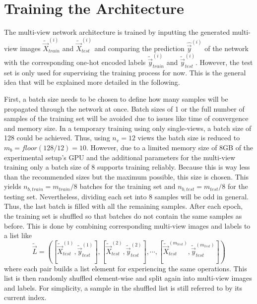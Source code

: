 \section{Training the Architecture}
\label{sec:methods-training}
The multi-view network architecture is trained by inputting the generated multi-view images $\tilde{\vec{X}}_{train}^{(i)}$ and $\tilde{\vec{X}}_{test}^{(i)}$ and comparing the prediction $\hat{\vec{y}}^{(i)}$ of the network with the corresponding one-hot encoded labels $\tilde{\vec{y}}_{train}^{(i)}$ and $\tilde{\vec{y}}_{test}^{(i)}$.
However, the test set is only used for supervising the training process for now.
This is the general idea that will be explained more detailed in the following.

First, a batch size needs to be chosen to define how many samples will be propagated through the network at once.
Batch sizes of 1 or the full number of samples of the training set will be avoided due to issues like time of convergence and memory size.
In a temporary training using only single-views, a batch size of 128 could be achieved.
Thus, using $n_v = 12$ views the batch size is reduced to $m_b = floor(128 / 12) = 10$.
However, due to a limited memory size of 8GB of the experimental setup's GPU and the additional parameters for the multi-view training only a batch size of 8 supports training reliably.
Because this is way less than the recommended sizes but the maximum possible, this size is chosen.
This yields $n_{b,train} = m_{train} / 8$ batches for the training set and $n_{b,test} = m_{test} / 8$ for the testing set.
Nevertheless, dividing each set into 8 samples will be odd in general.
Thus, the last batch is filled with all the remaining samples.
After each epoch, the training set is shuffled so that batches do not contain the same samples as before.
This is done by combining corresponding multi-view images and labels to a list like
\begin{equation}
\tilde{\vec{L}} = \left( \left[ \tilde{\vec{X}}_{test}^{(1)}, \tilde{\vec{y}}_{test}^{(1)} \right], \left[ \tilde{\vec{X}}_{test}^{(2)}, \tilde{\vec{y}}_{test}^{(2)} \right], \cdots , \left[ \tilde{\vec{X}}_{test}^{(m_{test})}, \tilde{\vec{y}}_{test}^{(m_{test})} \right] \right)
\end{equation}
where each pair builds a list element for experiencing the same operations.
This list is then randomly shuffled element-wise and split again into multi-view images and labels.
For simplicity, a sample in the shuffled list is still referred to by its current index.

